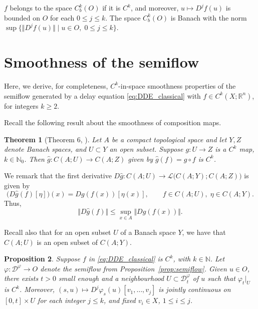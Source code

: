 \documentclass[a4paper, 12pt, oneside, reqno, notitlepage]{amsart}
\theoremstyle{plain}
\newtheorem{theorem}{Theorem}
\newtheorem{proposition}[theorem]{Proposition}
\theoremstyle{definition}
\theoremstyle{remark}
\begin{document}
$f$ belongs to the space $C^k_b(O)$ if it is $C^k$, and moreover, $u \mapsto D^jf(u)$ is bounded on $O$ for each $0 \leq j \leq k$.
The space $C^k_b(O)$ is Banach with the norm $\sup \{ \Vert D^jf(u) \Vert \; | \; u \in O, \; 0\leq j \leq k \}$.



\section{Smoothness of the semiflow}
\label{sect:semiflow_smoothness}


Here, we derive, for completeness, $C^k$-in-space smoothness properties of the semiflow generated by a delay equation \eqref{eq:DDE_classical} with $f \in C^k(X;\mathbb{R}^n)$, for integers $k \geq 2$.







Recall the following result about the smoothness of composition maps.

\begin{theorem}[Theorem 6, \cite{Irwin72}] \label{thm:irwin}
    Let $A$ be a compact topological space and let $Y,Z$ denote Banach spaces, and $U \subset Y$ an open subset.
    Suppose $g : U \to Z$ is a $C^k$ map, $k \in \mathbb{N}_0$.
    Then $\hat{g} : C(A;U) \to C(A;Z)$ given by $\hat{g}(f) = g \circ f$ is $C^k$.
\end{theorem}

We remark that the first derivative $D \hat{g} : C(A;U) \to \mathcal{L}\big( C(A;Y);C(A;Z) \big)$ is given by
\begin{displaymath}
    \big(D\hat{g} (f) [\eta] \big) (x) = Dg(f(x))[\eta(x)], \qquad f \in C(A;U), \; \eta \in C(A;Y).
\end{displaymath}
Thus, 
\begin{equation}
    \Vert D\hat{g} (f) \Vert \leq \sup_{x \in A} \Vert Dg(f(x)) \Vert.
    \label{eq:Dghat}
\end{equation}

Recall also that for an open subset $U$ of a Banach space $Y$, we have that $C(A;U)$ is an open subset of $C(A;Y)$. 

\begin{proposition} \label{prop:sf_smoothness}
    Suppose $f$ in \eqref{eq:DDE_classical} is $C^k$, with $k \in \mathbb{N}$.
    Let $\varphi: \mathcal{D}^\varphi \to O $ denote the semiflow from Proposition~\ref{prop:semiflow}.
    Given $u \in O$, there exists $t >0$ small enough and a neighbourhood $U \subset \mathcal{D}_t^\varphi$ of $u$ such that $\varphi_t|_{U}$ is $C^k$.
    Moreover, $(s,u)\mapsto D^j \varphi_s(u)[v_1,\ldots,v_j]$ is jointly continuous on $ [0,t] \times U$ for each integer $j \leq k$, and fixed $v_i \in X$, $1 \leq i \leq j$.
\end{proposition}
\end{document}
